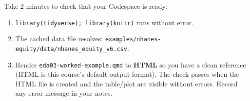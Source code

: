 \documentclass[
  letterpaper,
  DIV=11,
  numbers=noendperiod,
  oneside]{scrreprt}
\providecommand{\tightlist}{%
  \setlength{\itemsep}{0pt}\setlength{\parskip}{0pt}}
\begin{document}

Take 2 minutes to check that your Codespace is ready:

\begin{enumerate}
\def\labelenumi{\arabic{enumi}.}
\tightlist
\item
  \texttt{library(tidyverse);\ library(knitr)} runs without error.
\item
  The cached data file resolves:
  \texttt{examples/nhanes-equity/data/nhanes\_equity\_v6.csv}.
\item
  Render \texttt{eda03-worked-example.qmd} to \textbf{HTML} so you have
  a clean reference (HTML is this course's default output format). The
  check passes when the HTML file is created and the table/plot are
  visible without errors. Record any error message in your notes.
\end{enumerate}
\end{document}
